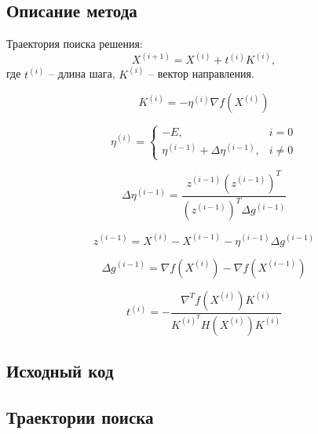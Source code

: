 \subsection{Описание метода}

Траектория поиска решения:
\begin{equation*}
X^{(i+1)}  = X^{(i)} + t^{(i)} K^{(i)},
\end{equation*}
где $t^{(i)}$ -- длина шага, $K^{(i)}$ -- вектор направления.

\begin{equation*}
K^{(i)} = -\eta^{(i)} \nabla f\left(X^{(i)}\right)
\end{equation*}

\begin{equation*}
\eta^{(i)} = 
\begin{cases}
-E, &i = 0\\
\eta^{(i-1)} + \Delta \eta^{(i-1)}, &i \neq 0
\end{cases}
\end{equation*}

\begin{equation*}
\Delta \eta^{(i-1)} = \dfrac{z^{(i-1)} \left(z^{(i-1)}\right)^T}{\left(z^{(i-1)}\right)^T \Delta g^{(i-1)}}
\end{equation*}

\begin{equation*}
z^{(i-1)} = X^{(i)} - X^{(i-1)} - \eta^{(i-1)} \Delta g^{(i-1)}
\end{equation*}

\begin{equation*}
\Delta g^{(i-1)} = \nabla f\left(X^{(i)}\right) - \nabla f\left(X^{(i-1)}\right)
\end{equation*}

\begin{equation*}
t^{(i)} = -\dfrac{\nabla^T f\left(X^{(i)}\right) K^{(i)}}{K^{(i)^T} H\left(X^{(i)}\right) K^{(i)}}
\end{equation*}

\subsection{Исходный код}



\subsection{Траектории поиска}

